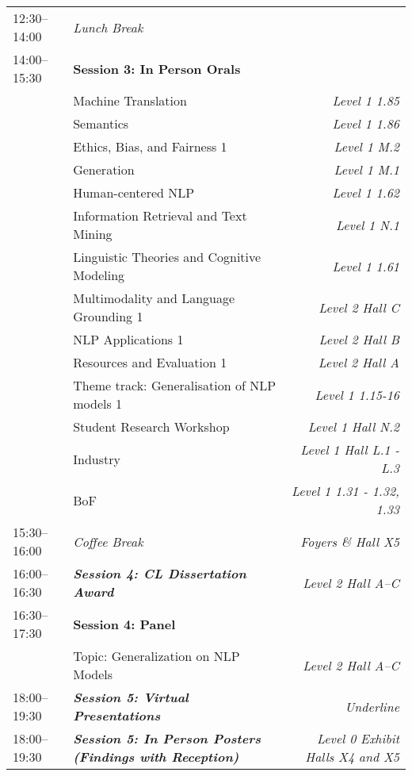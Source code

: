 \begin{xltabular}{\linewidth}{l X r}
    12:30--14:00    &   \textit{Lunch Break}  & \\

    14:00--15:30    &   \textbf{Session 3: In Person Orals}   &   \\
    &   Machine Translation   &   \textit{Level 1 1.85} \\
    &   Semantics  &   \textit{Level 1 1.86} \\
    &   Ethics, Bias, and Fairness 1  &   \textit{Level 1 M.2} \\
    &   Generation  &   \textit{Level 1 M.1} \\
    &   Human-centered NLP  &   \textit{Level 1 1.62} \\
    &   Information Retrieval and Text Mining  &   \textit{Level 1 N.1} \\
    &   Linguistic Theories and Cognitive Modeling  &   \textit{Level 1 1.61} \\
    &   Multimodality and Language Grounding 1  &   \textit{Level 2 Hall C} \\
    &   NLP Applications 1  &   \textit{Level 2 Hall B} \\
    &   Resources and Evaluation 1  &   \textit{Level 2 Hall A} \\
    &   Theme track: Generalisation of NLP models 1  &   \textit{Level 1 1.15-16} \\
    &   Student Research Workshop  &   \textit{Level 1 Hall N.2} \\
    &   Industry  &   \textit{Level 1 Hall L.1 - L.3} \\
    &   BoF &   \textit{Level 1 1.31 - 1.32, 1.33} \\

    15:30--16:00    &   \textit{Coffee Break}    &  \textit{Foyers \& Hall X5} \\

    16:00--16:30    &   \textit{\textbf{Session 4: CL Dissertation Award}}    &  \textit{Level 2 Hall A--C} \\

    16:30--17:30    &   \textbf{Session 4: Panel}  &   \\
    &   Topic: Generalization on NLP Models    &   \textit{Level 2 Hall A--C} \\

    18:00--19:30    &   \textit{\textbf{Session 5: Virtual Presentations}}    & \textit{Underline}  \\
    18:00--19:30    &   \textit{\textbf{Session 5: In Person Posters (Findings with Reception)}}    &  \textit{Level 0 Exhibit Halls X4 and X5} \\


\end{xltabular}

